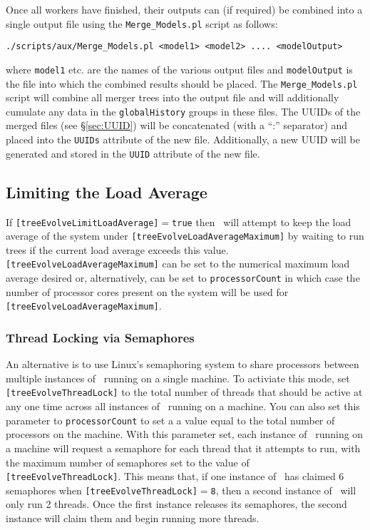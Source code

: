 Once all workers have finished, their outputs can (if required) be combined into a single output file using the {\tt Merge\_Models.pl} script as follows:
\begin{verbatim}
./scripts/aux/Merge_Models.pl <model1> <model2> .... <modelOutput>
\end{verbatim}
where {\tt model1} etc. are the names of the various output files and {\tt modelOutput} is the file into which the combined results should be placed. The {\tt Merge\_Models.pl} script will combine all merger trees into the output file and will additionally cumulate any data in the {\tt globalHistory} groups in these files. The UUIDs of the merged files (see \S\ref{sec:UUID}) will be concatenated (with a ``:'' separator) and placed into the {\tt UUIDs} attribute of the new file. Additionally, a new UUID will be generated and stored in the {\tt UUID} attribute of the new file.

\subsection{Limiting the Load Average}

If {\tt [treeEvolveLimitLoadAverage]}$=${\tt true} then \glc\ will attempt to keep the load average of the system under {\tt [treeEvolveLoadAverageMaximum]} by waiting to run trees if the current load average exceeds this value. {\tt [treeEvolveLoadAverageMaximum]} can be set to the numerical maximum load average desired or, alternatively, can be set to {\tt processorCount} in which case the number of processor cores present on the system will be used for {\tt [treeEvolveLoadAverageMaximum]}.

\subsubsection{Thread Locking via Semaphores}\label{sec:Semaphores}

An alternative is to use Linux's semaphoring system to share processors between multiple instances of \glc\ running on a single machine. To activiate this mode, set {\tt [treeEvolveThreadLock]} to the total number of threads that should be active at any one time across all instances of \glc\ running on a machine. You can also set this parameter to {\tt processorCount} to set a a value equal to the total number of processors on the machine. With this parameter set, each instance of \glc\ running on a machine will request a semaphore for each thread that it attempts to run, with the maximum number of semaphores set to the value of {\tt [treeEvolveThreadLock]}. This means that, if one instance of \glc\ has claimed 6 semaphores when {\tt [treeEvolveThreadLock]}$=${\tt 8}, then a second instance of \glc\ will only run 2 threads. Once the first instance releases its semaphores, the second instance will claim them and begin running more threads.

